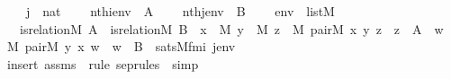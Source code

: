 \begin{isabellebody}
\ \ \ \ {\isachardoublequoteopen}j\ {\isasymin}\ nat{\isachardoublequoteclose}\isanewline
\ \ \ \ {\isachardoublequoteopen}nth{\isacharparenleft}{\kern0pt}i{\isacharcomma}{\kern0pt}env{\isacharparenright}{\kern0pt}\ {\isacharequal}{\kern0pt}\ A{\isachardoublequoteclose}\isanewline
\ \ \ \ {\isachardoublequoteopen}nth{\isacharparenleft}{\kern0pt}j{\isacharcomma}{\kern0pt}env{\isacharparenright}{\kern0pt}\ {\isacharequal}{\kern0pt}\ B{\isachardoublequoteclose}\isanewline
\ \ \ \ {\isachardoublequoteopen}env\ {\isasymin}\ list{\isacharparenleft}{\kern0pt}M{\isacharparenright}{\kern0pt}{\isachardoublequoteclose}\ \isanewline
\ \ \ {\isachardoublequoteopen}is{\isacharunderscore}{\kern0pt}relation{\isacharparenleft}{\kern0pt}{\isacharhash}{\kern0pt}{\isacharhash}{\kern0pt}M{\isacharcomma}{\kern0pt}\ A{\isacharparenright}{\kern0pt}\ {\isasymand}\ is{\isacharunderscore}{\kern0pt}relation{\isacharparenleft}{\kern0pt}{\isacharhash}{\kern0pt}{\isacharhash}{\kern0pt}M{\isacharcomma}{\kern0pt}\ B{\isacharparenright}{\kern0pt}\ {\isasymand}\ {\isacharparenleft}{\kern0pt}{\isasymforall}x\ {\isasymin}\ M{\isachardot}{\kern0pt}\ {\isasymforall}y\ {\isasymin}\ M{\isachardot}{\kern0pt}\ {\isacharparenleft}{\kern0pt}{\isasymexists}z\ {\isasymin}\ M{\isachardot}{\kern0pt}\ pair{\isacharparenleft}{\kern0pt}{\isacharhash}{\kern0pt}{\isacharhash}{\kern0pt}M{\isacharcomma}{\kern0pt}\ x{\isacharcomma}{\kern0pt}\ y{\isacharcomma}{\kern0pt}\ z{\isacharparenright}{\kern0pt}\ {\isasymand}\ z\ {\isasymin}\ A{\isacharparenright}{\kern0pt}\ {\isasymlongleftrightarrow}\ {\isacharparenleft}{\kern0pt}{\isasymexists}w\ {\isasymin}\ M{\isachardot}{\kern0pt}\ pair{\isacharparenleft}{\kern0pt}{\isacharhash}{\kern0pt}{\isacharhash}{\kern0pt}M{\isacharcomma}{\kern0pt}\ y{\isacharcomma}{\kern0pt}\ x{\isacharcomma}{\kern0pt}\ w{\isacharparenright}{\kern0pt}\ {\isasymand}\ w\ {\isasymin}\ B{\isacharparenright}{\kern0pt}{\isacharparenright}{\kern0pt}\ {\isasymlongleftrightarrow}\ sats{\isacharparenleft}{\kern0pt}M{\isacharcomma}{\kern0pt}{\isacharquery}{\kern0pt}fm{\isacharparenleft}{\kern0pt}i{\isacharcomma}{\kern0pt}\ j{\isacharparenright}{\kern0pt}{\isacharcomma}{\kern0pt}env{\isacharparenright}{\kern0pt}{\isachardoublequoteclose}\ \isanewline
%
\isadelimproof
\ \ %
\endisadelimproof
%
\isatagproof
{}\isamarkupfalse%
\ {\isacharparenleft}{\kern0pt}insert\ assms\ {\isacharsemicolon}{\kern0pt}\ {\isacharparenleft}{\kern0pt}rule\ sep{\isacharunderscore}{\kern0pt}rules\ {\isacharbar}{\kern0pt}\ simp{\isacharparenright}{\kern0pt}{\isacharplus}{\kern0pt}{\isacharparenright}{\kern0pt}%

\end{isabellebody}
